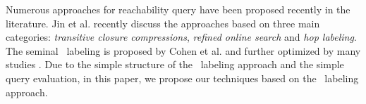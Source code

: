\stab
{}\label{subsec:related:reach} Numerous approaches for
reachability query have been proposed recently in the literature. Jin
et al. \cite{sigmod2012} recently discuss the approaches based on
three main categories: {\em transitive closure compressions}, {\em
  refined online search} and {\em hop labeling}. The seminal
\hop\ labeling is proposed by Cohen et al. \cite{cohen} and further optimized by many studies \cite{hopi,chengjf1, chengjf2}.  Due to the simple
structure of the \hop\ labeling approach and the simple query
evaluation, in this paper, we propose our techniques based on the
\hop\ labeling approach.











